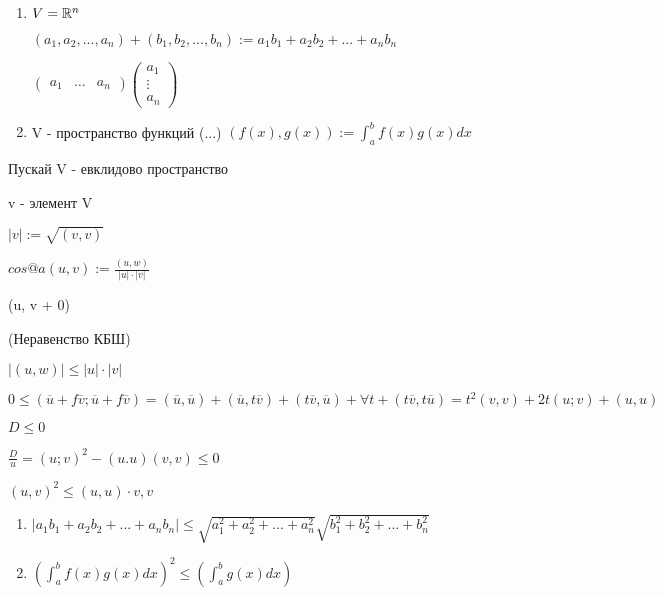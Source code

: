 \begin{eg}
    \begin{enumerate}
        \item $ V = \mathbb{R}^n $
        
        $(a_1, a_2, ..., a_n) + (b_1, b_2, ..., b_n) := a_1 b_1 + a_2 b_2 + ... + a_n b_n$

        
    $\left(
    \begin{array}{ccc}
        a_1 & \ldots & a_n
    \end{array}\right) \left(
                \begin{array}{c}
                    a_1\\
                    \vdots\\
                    a_n
                \end{array}
                \right)$

        \item V - пространство функций (...) 
        $(f(x), g(x)) := \int_a^b f(x)g(x)dx$
    \end{enumerate}
\end{eg}

\begin{definition}
    Пускай V - евклидово пространство

    v - элемент V

    $|v| := \sqrt{ (v, v) }$

    $cos @a(u, v) := \frac{(u, w)}{|u| \cdot |v|}$

    (u, v + 0)


\end{definition}

\begin{theorem}(Неравенство КБШ)

    $|(u, w)| \leq |u| \cdot |v|$

\end{theorem}

$0 \leq (\overline u + f \overline v; \overline u + f \overline v) = (\overline u, \overline u) + (\overline u, t \overline v) + (t \overline v, \overline u)+ \forall t + (t \overline v, t \overline u) = t^2 (v, v) + 2t(u;v) + (u, u)$

$D \leq 0$

$\frac{D}{u} = (u; v)^2 - (u. u)(v, v) \leq 0$

$(u, v)^2 \leq (u, u) \cdot v, v$

\begin{definition}
    \begin{enumerate}
        \item $|a_1 b_1 + a_2 b_2 + ... + a_n b_n| \leq \sqrt{a_1^2 + a_2^2 + ... + a_n^2} \sqrt{b_1^2 + b_2^2 + ... + b_n^2}$
        
        \item $(\int_a^b f(x)g(x)dx)^2 \leq (\int_a^b g(x)dx)$
    \end{enumerate}
\end{definition}


